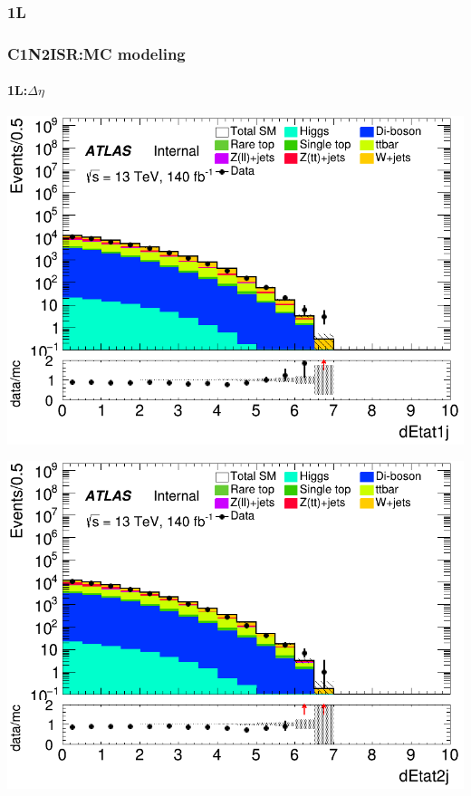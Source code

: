 \documentclass[usenames,dvipsnames]{beamer}
\begin{document}
\subsubsection{1L}
\begin{frame}
\frametitle{C1N2ISR:MC modeling}
\framesubtitle{1L:\quad $\Delta\eta$}
    \begin{minipage}{0.32\textwidth}
        \centering
        \includegraphics[width=\textwidth]{graphics/L_met/L_met_dEtat1j.png}
    \end{minipage}
    \hfill
    \begin{minipage}{0.32\textwidth}
        \centering
        \includegraphics[width=\textwidth]{graphics/L_met/L_met_dEtat2j.png}
    \end{minipage}
    \hfill
    \begin{minipage}{0.32\textwidth}

\end{minipage}
\end{frame}
\end{document}
